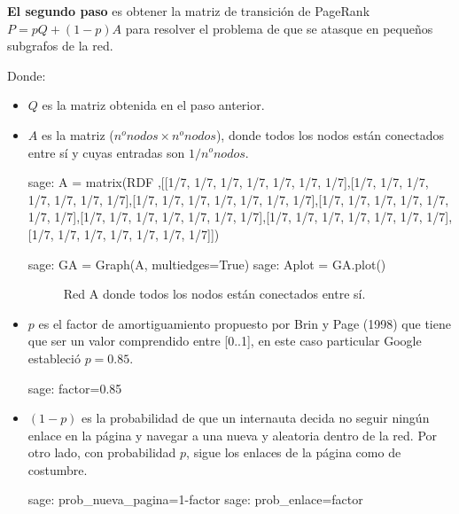 \par \textbf{El segundo paso} es obtener la matriz de transición de PageRank $P=pQ + (1-p)A$ para resolver el 
problema de que se atasque en pequeños subgrafos de la red.
\par Donde:
\begin{itemize}
    \item $Q$ es la matriz obtenida en el paso anterior.
    \item $A$ es la matriz ($n^onodos \times n^onodos$), donde todos los nodos están conectados entre sí y cuyas 
    entradas son $1/n^o nodos$.
    \begin{sagecommandline}
        sage: A = matrix(RDF ,[[1/7, 1/7, 1/7, 1/7, 1/7, 1/7, 1/7],[1/7, 1/7, 1/7, 1/7, 1/7, 1/7, 1/7],[1/7, 1/7, 1/7, 1/7, 1/7, 1/7, 1/7],[1/7, 1/7, 1/7, 1/7, 1/7, 1/7, 1/7],[1/7, 1/7, 1/7, 1/7, 1/7, 1/7, 1/7],[1/7, 1/7, 1/7, 1/7, 1/7, 1/7, 1/7],[1/7, 1/7, 1/7, 1/7, 1/7, 1/7, 1/7]])
    \end{sagecommandline} 
    \begin{sagecommandline}
        sage: GA = Graph(A, multiedges=True)
        sage: Aplot = GA.plot()
    \end{sagecommandline}
    
    \begin{figure}[H]
        \centering
        \label{redA}
        \caption{Red A donde todos los nodos están conectados entre sí.}
    \end{figure}
    \item $p$ es el factor de amortiguamiento propuesto por Brin y Page (1998) que tiene que ser un valor 
    comprendido entre [0..1], en este caso particular Google estableció $p=0.85$.
    \begin{sagecommandline}
        sage: factor=0.85
    \end{sagecommandline}
    \item  $(1-p)$ es la probabilidad de que un internauta decida no seguir ningún enlace en la página y 
    navegar a una nueva y aleatoria dentro de la red. Por otro lado, con probabilidad $p$, sigue los enlaces de 
    la página como de costumbre.
    \begin{sagecommandline}
        sage: prob_nueva_pagina=1-factor
        sage: prob_enlace=factor
    \end{sagecommandline}
\end{itemize}

